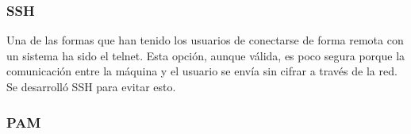 \documentclass[titlepage]{article}
\begin{document}
\subsubsection{\Gls{SSH}}
Una de las formas que han tenido los usuarios de conectarse de forma remota con un sistema ha sido el \Gls{telnet}. Esta opción, aunque válida, es poco segura porque la comunicación entre la máquina y el usuario se envía sin cifrar a través de la red.\\Se desarrolló SSH para evitar esto.

\subsubsection{\Gls{PAM}}

\clearpage
\printbibliography[heading=bibintoc,title={Bibliografía}]
\end{document}
